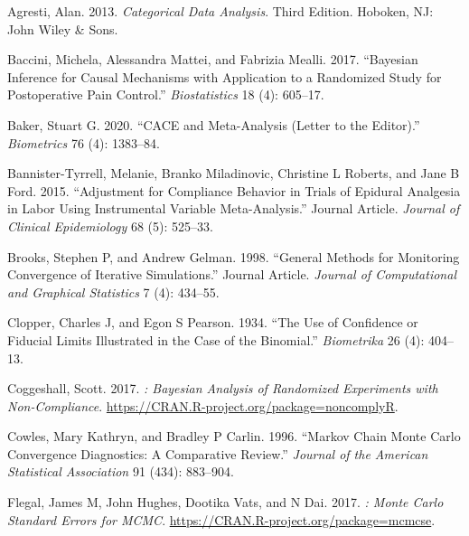 \hypertarget{refs}{}
\begin{CSLReferences}{1}{0}
\leavevmode{}%
Agresti, Alan. 2013. \emph{Categorical Data Analysis}. Third Edition. Hoboken, NJ: John Wiley \& Sons.

\leavevmode{}%
Baccini, Michela, Alessandra Mattei, and Fabrizia Mealli. 2017. {``Bayesian Inference for Causal Mechanisms with Application to a Randomized Study for Postoperative Pain Control.''} \emph{Biostatistics} 18 (4): 605--17.

\leavevmode{}%
Baker, Stuart G. 2020. {``CACE and Meta-Analysis (Letter to the Editor).''} \emph{Biometrics} 76 (4): 1383--84.

\leavevmode{}%
Bannister-Tyrrell, Melanie, Branko Miladinovic, Christine L Roberts, and Jane B Ford. 2015. {``Adjustment for Compliance Behavior in Trials of Epidural Analgesia in Labor Using Instrumental Variable Meta-Analysis.''} Journal Article. \emph{Journal of Clinical Epidemiology} 68 (5): 525--33.

\leavevmode{}%
Brooks, Stephen P, and Andrew Gelman. 1998. {``General Methods for Monitoring Convergence of Iterative Simulations.''} Journal Article. \emph{Journal of Computational and Graphical Statistics} 7 (4): 434--55.

\leavevmode{}%
Clopper, Charles J, and Egon S Pearson. 1934. {``The Use of Confidence or Fiducial Limits Illustrated in the Case of the Binomial.''} \emph{Biometrika} 26 (4): 404--13.

\leavevmode{}%
Coggeshall, Scott. 2017. \emph{: Bayesian Analysis of Randomized Experiments with Non-Compliance}. \url{https://CRAN.R-project.org/package=noncomplyR}.

\leavevmode{}%
Cowles, Mary Kathryn, and Bradley P Carlin. 1996. {``Markov Chain Monte Carlo Convergence Diagnostics: A Comparative Review.''} \emph{Journal of the American Statistical Association} 91 (434): 883--904.

\leavevmode{}%
Flegal, James M, John Hughes, Dootika Vats, and N Dai. 2017. \emph{: Monte Carlo Standard Errors for MCMC}. \url{https://CRAN.R-project.org/package=mcmcse}.


\end{CSLReferences}
